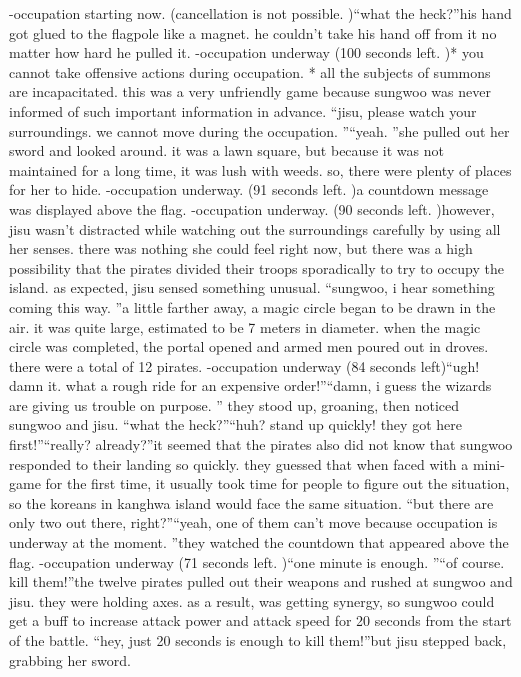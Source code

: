 -occupation starting now.
 (cancellation is not possible.
)“what the heck?”his hand got glued to the flagpole like a magnet.
 he couldn’t take his hand off from it no matter how hard he pulled it.
-occupation underway (100 seconds left.
)* you cannot take offensive actions during occupation.
* all the subjects of summons are incapacitated.
this was a very unfriendly game because sungwoo was never informed of such important information in advance.
“jisu, please watch your surroundings.
 we cannot move during the occupation.
”“yeah.
”she pulled out her sword and looked around.
 it was a lawn square, but because it was not maintained for a long time, it was lush with weeds.
 so, there were plenty of places for her to hide.
-occupation underway.
 (91 seconds left.
)a countdown message was displayed above the flag.
-occupation underway.
 (90 seconds left.
)however, jisu wasn’t distracted while watching out the surroundings carefully by using all her senses.
there was nothing she could feel right now, but there was a high possibility that the pirates divided their troops sporadically to try to occupy the island.
as expected, jisu sensed something unusual.
“sungwoo, i hear something coming this way.
”a little farther away, a magic circle began to be drawn in the air.
 it was quite large, estimated to be 7 meters in diameter.
when the magic circle was completed, the portal opened and armed men poured out in droves.
 there were a total of 12 pirates.
-occupation underway (84 seconds left)“ugh! damn it.
 what a rough ride for an expensive order!”“damn, i guess the wizards are giving us trouble on purpose.
”
they stood up, groaning, then noticed sungwoo and jisu.
“what the heck?”“huh? stand up quickly! they got here first!”“really? already?”it seemed that the pirates also did not know that sungwoo responded to their landing so quickly.
 they guessed that when faced with a mini-game for the first time, it usually took time for people to figure out the situation, so the koreans in kanghwa island would face the same situation.
“but there are only two out there, right?”“yeah, one of them can’t move because occupation is underway at the moment.
”they watched the countdown that appeared above the flag.
-occupation underway (71 seconds left.
)“one minute is enough.
”“of course.
 kill them!”the twelve pirates pulled out their weapons and rushed at sungwoo and jisu.
 they were holding axes.
 as a result,  was getting synergy, so sungwoo could get a buff to increase attack power and attack speed for 20 seconds from the start of the battle.
“hey, just 20 seconds is enough to kill them!”but jisu stepped back, grabbing her sword.

